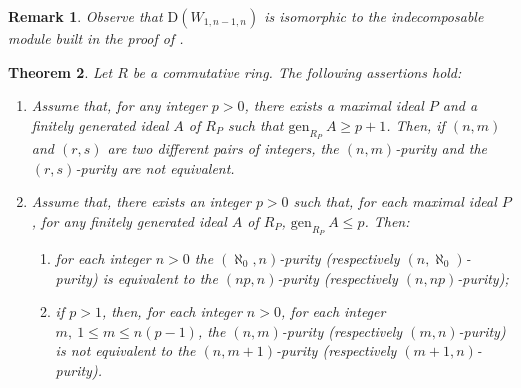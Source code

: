 \documentclass{amsart}
\newtheorem{theorem}{Theorem}[section]
\newtheorem{remark}[theorem]{Remark}
\begin{document}
\begin{remark}
Observe that $\mathrm{D}(W_{1,n-1,n})$ is isomorphic to the indecomposable module built  in the proof of \cite[Theorem 2]{War70}.
\end{remark}



\begin{theorem}
 \label{T:ComPur} Let $R$ be a commutative ring. The following assertions hold:
\begin{enumerate}
\item Assume that, for any integer $p>0$, there exists a maximal ideal $P$ and a  finitely generated ideal $A$ of $R_P$ such that $\mathrm{gen}_{R_P}\ A\geq p+1$. Then, if $(n,m)$ and $(r,s)$ are two different pairs of integers, the $(n,m)$-purity and the $(r,s)$-purity are not equivalent.
\item Assume that, there exists an integer $p>0$ such that, for each maximal ideal $P$, for any finitely generated ideal $A$ of $R_P$, $\mathrm{gen}_{R_P}\ A\leq p$. Then:
\begin{enumerate}
\item for each integer $n>0$ the $(\aleph_0,n)$-purity (respectively $(n,\aleph_0)$-purity) is equivalent to the $(np,n)$-purity (respectively $(n,np)$-purity);
\item if $p>1$, then, for each integer $n>0$, for each integer $m,\ 1\leq m\leq n(p-1)$, the $(n,m)$-purity (respectively $(m,n)$-purity) is not equivalent to the $(n,m+1)$-purity (respectively $(m+1,n)$-purity).
\end{enumerate}
\end{enumerate}
\end{theorem}
\end{document}

